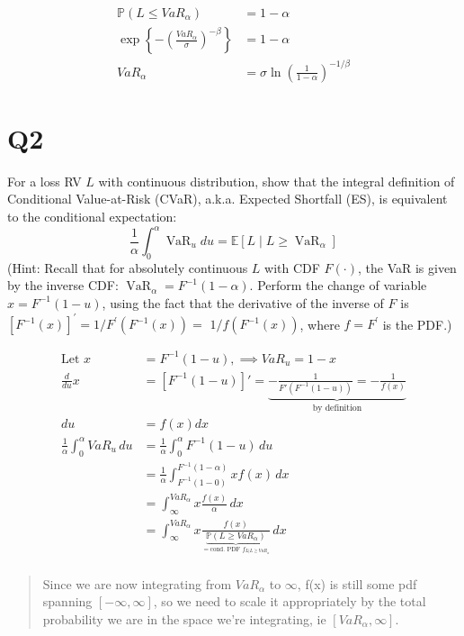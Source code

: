 \documentclass[
  oneside]{book}
\begin{document}
\[
\begin{aligned}
\mathbb{P}(L \leq VaR_{\alpha}) &= 1-\alpha\\
\exp \left\{ -\left( \frac{VaR_{\alpha}}{\sigma} \right)^{-\beta} \right\}  &= 1-\alpha\\
VaR_{\alpha} &= \sigma\ln\left( \frac{1}{1-\alpha} \right)^{-1/\beta}
\end{aligned}
\]

\hypertarget{q2-4}{%
\section{Q2}\label{q2-4}}

For a loss RV \(L\) with continuous distribution, show that the integral definition of Conditional Value-at-Risk (CVaR), a.k.a. Expected Shortfall (ES), is equivalent to the conditional expectation:
\[
\frac{1}{\alpha} \int_0^\alpha \operatorname{VaR}_u d u=\mathbb{E}\left[L \mid L \geq \operatorname{VaR}_\alpha\right]
\]
(Hint: Recall that for absolutely continuous \(L\) with CDF \(F(\cdot)\), the VaR is given by the inverse CDF: \(\operatorname{VaR}_\alpha=F^{-1}(1-\alpha)\). Perform the change of variable \(x=F^{-1}(1-u)\), using the fact that the derivative of the inverse of \(F\) is \(\left[F^{-1}(x)\right]^{\prime}=1 / F^{\prime}\left(F^{-1}(x)\right)=\) \(1 / f\left(F^{-1}(x)\right)\), where \(f=F^{\prime}\) is the PDF.)

\[
\begin{aligned}
\text{Let } x &= F^{-1}(1-u), \implies VaR_{u} = 1-x\\
\frac{d}{du} x &= [F^{-1}(1-u)]' = \underbrace{ -\frac{1}{F'(F^{-1}(1-u))} = -\frac{1}{f(x)} }_{ \text{by definition} } \\
du &= f(x)dx\\
\frac{1}{\alpha} \int ^{\alpha}_{0}VaR_{u} \, du &=  \frac{1}{\alpha} \int ^{\alpha}_{0} F^{-1}(1-u) \, du\\
&= \frac{1}{\alpha} \int ^{F^{-1}(1-\alpha)}_{F^{-1}(1-0)} xf(x)\, dx\\
&= \int ^{VaR_{\alpha}}_{\infty}x \frac{f(x)}{\alpha} \, dx \\
&= \int ^{VaR_{\alpha}}_{\infty}x \frac{f(x)}{\underbrace{ \mathbb{P}(L \geq VaR_{\alpha}) }_{ = \text{cond. PDF } f_{L|L\geq VaR_{\alpha}}}} \, dx \\
\end{aligned}
\]

\begin{quote}
Since we are now integrating from \(VaR_{\alpha}\) to \(\infty\), f(x) is still some pdf spanning \([-\infty,\infty]\), so we need to scale it appropriately by the total probability we are in the space we're integrating, ie \([VaR_{\alpha}, \infty]\).
\end{quote}
\end{document}
